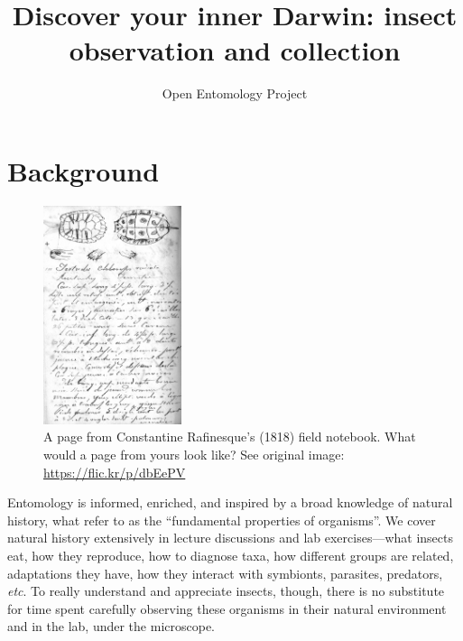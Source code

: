 \documentclass[letterpaper, 11pt]{article}
\title{Discover your inner Darwin: insect observation and collection}
\author{Open Entomology Project}
\begin{document}
\cleanlookdateon %
\maketitle
\thispagestyle{fancy}

\section*{Background}
\begin{figure}
  \vspace{-24pt}
  \begin{center}
    \includegraphics[width=0.36\textwidth]{Rafinesque}%
  \end{center}
  \vspace{-17pt}
  \caption{A page from Constantine Rafinesque's (1818) field notebook. What would a page from yours look like? See original image: \url{https://flic.kr/p/dbEePV}}
  \vspace{-30pt}
\end{figure}

Entomology is informed, enriched, and inspired by a broad knowledge of natural history, what \cite{Tewksbury01042014} refer to as the ``fundamental properties of organisms''. We cover natural history extensively in lecture discussions and lab exercises---what insects eat, how they reproduce, how to diagnose taxa, how different groups are related, adaptations they have, how they interact with symbionts, parasites, predators, \textit{etc}. To really understand and appreciate insects, though, there is no substitute for time spent carefully observing these organisms in their natural environment and in the lab, under the microscope. \\
\end{document}
